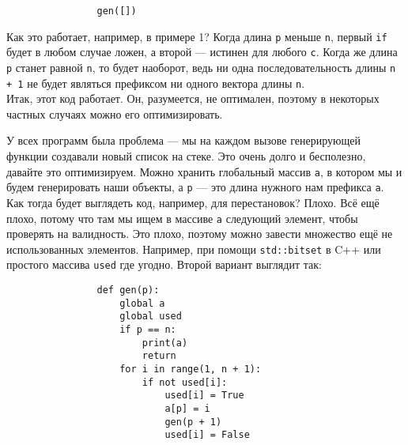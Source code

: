 \documentclass{article}
\begin{document}
\begin{itemize}
\begin{Comment}
\begin{verbatim}
                gen([])
            \end{verbatim}
            Как это работает, например, в примере 1? Когда длина \texttt{p} меньше \texttt{n}, первый \texttt{if} будет в любом случае ложен, а второй --- истинен для любого \texttt{c}. Когда же длина \texttt{p} станет равной \texttt{n}, то будет наоборот, ведь ни одна последовательность длины \texttt{n + 1} не будет являться префиксом ни одного вектора длины \texttt{n}.\\
            Итак, этот код работает. Он, разумеется, не оптимален, поэтому в некоторых частных случаях можно его оптимизировать.
        \end{Comment}
        \begin{Comment}
            У всех программ была проблема --- мы на каждом вызове генерирующей функции создавали новый список на стеке. Это очень долго и бесполезно, давайте это оптимизируем. Можно хранить глобальный массив \texttt{a}, в котором мы и будем генерировать наши объекты, а \texttt{p} --- это длина нужного нам префикса \texttt{a}. Как тогда будет выглядеть код, например, для перестановок? Плохо. Всё ещё плохо, потому что там мы ищем в массиве \texttt{a} следующий элемент, чтобы проверять на валидность. Это плохо, поэтому можно завести множество ещё не использованных элементов. Например, при помощи \texttt{std::bitset} в C++ или простого массива \texttt{used} где угодно. Второй вариант выглядит так:
            \begin{verbatim}
                def gen(p):
                    global a
                    global used
                    if p == n:
                        print(a)
                        return
                    for i in range(1, n + 1):
                        if not used[i]:
                            used[i] = True
                            a[p] = i
                            gen(p + 1)
                            used[i] = False
                

\end{verbatim}
\end{Comment}
\end{itemize}
\end{document}
